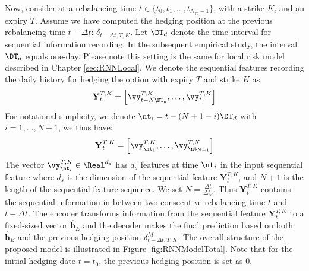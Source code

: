 Now, consider at a  rebalancing time $t \in \{t_0,t_1, \dots, t_{N_{rb}-1}\}$, with a strike $K$, and an expiry $T$. Assume we have computed the hedging position at the previous rebalancing time $t-\Delta t$: $\delta_{t-\Delta t, T,K}$. Let $\DT_{d}$ denote the time interval for sequential information recording. In  the subsequent empirical study, the interval $\DT_{d}$ equals one-day. Please note this setting is the same for local risk model described in Chapter \ref{sec:RNNLocal}.  We denote the sequential features recording the daily history  for hedging the option with expiry $T$ and strike $K$ as
\[
\mathbf{Y}_{t}^{T,K}=\left[\vy^{T,K}_{t-N \DT_{d}},\dots,\vy^{T,K}_{t}\right]
\]
For notational simplicity, we denote $\nt_i=t-(N+1-i)\DT_d$ with $i=1, \dots,N+1$, we thus have:
\[
\mathbf{Y}_{t}^{T,K}=\left[\vy^{T,K}_{\nt_{1}},\dots,\vy^{T,K}_{\nt_{N+1}}\right]
\]
The vector $\vy^{T,K}_{\nt_{i}} \in \Real^{d_s}$ has  $d_s$ features at time $\nt_{i}$ in the input sequential feature where
 $d_s$ is the dimension of the sequential feature $\mathbf{Y}_{t}^{T,K}$, and
$N+1$ is the length of the sequential feature sequence. We set $N=\frac{\Delta t}{\Delta t_d}$. Thus $\mathbf{Y}_{t}^{T,K}$ contains the sequential information in between two consecutive rebalancing time $t$ and $t-\Delta t$.
The encoder transforms information from the sequential feature $\mathbf{Y}_{t}^{T,K}$ to  a fixed-sized vector
$\mathbf{\widehat{h}}_E$   and the decoder makes the final prediction based on both $\mathbf{\widehat{h}}_E$  and the previous hedging position $\delta^{M}_{t-\Delta t,T,K}$. The overall structure of the proposed model is illustrated in Figure \ref{fig:RNNModelTotal}. Note that for the initial hedging date $t=t_0$, the previous hedging position is set as $0$.



